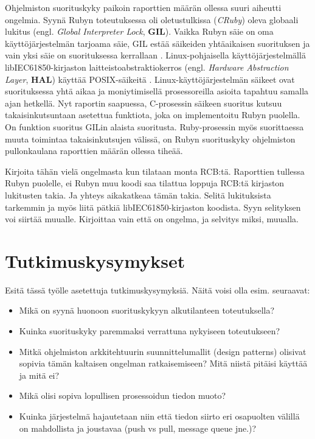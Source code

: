 Ohjelmiston suorituskyky paikoin raporttien määrän ollessa suuri aiheutti ongelmia. Syynä Rubyn toteutuksessa oli oletustulkissa (\emph{CRuby}) oleva globaali lukitus (engl. \emph{Global Interpreter Lock}, \textbf{GIL}). Vaikka Rubyn säie on oma käyttöjärjestelmän tarjoama säie, GIL estää säikeiden yhtäaikaisen suorituksen ja vain yksi säie on suorituksessa kerrallaan \mbox{\cite[s.~131--133]{Odaira2014}}. Linux-pohjaisella käyttöjärjestelmällä libIEC61850-kirjaston laitteistoabstraktiokerros (engl. \emph{Hardware Abstraction Layer}, \textbf{HAL}) käyttää POSIX-säikeitä \cite{libIEC61850-repo}. Linux-käyttöjärjestelmän säikeet ovat suorituksessa yhtä aikaa ja moniytimisellä prosessoreilla asioita tapahtuu samalla ajan hetkellä. Nyt raportin saapuessa, C-prosessin säikeen suoritus kutsuu takaisinkutsuntaan asetettua funktiota, joka on implementoitu Rubyn puolella. On funktion suoritus GILin alaista suoritusta. Ruby-prosessin myös suorittaessa muuta toimintaa takaisinkutsujen välissä, on Rubyn suorituskyky ohjelmiston pullonkaulana raporttien määrän ollessa tiheää.

\begin{it}
	Kirjoita tähän vielä ongelmasta kun tilataan monta RCB:tä. Raporttien tullessa Rubyn puolelle, ei Rubyn muu koodi saa tilattua loppuja RCB:tä kirjaston lukitusten takia. Ja yhteys aikakatkeaa tämän takia. Selitä lukituksista tarkemmin ja myös liitä pätkiä libIEC61850-kirjaston koodista. Syyn selityksen voi siirtää muualle. Kirjoittaa vain että on ongelma, ja selvitys miksi, muualla.
\end{it}

\section{Tutkimuskysymykset}
\begin{it}
Esitä tässä työlle asetettuja tutkimuskysymyksiä. Näitä voisi olla esim. seuraavat:
	\begin{itemize}
		\item Mikä on syynä huonoon suorituskykyyn alkutilanteen toteutuksella?
		\item Kuinka suorituskyky paremmaksi verrattuna nykyiseen toteutukseen?
		\item Mitkä ohjelmiston arkkitehtuurin suunnittelumallit (design patterns) olisivat sopivia tämän kaltaisen ongelman ratkaisemiseen? Mitä niistä pitäisi käyttää ja mitä ei?
		\item Mikä olisi sopiva lopullisen prosessoidun tiedon muoto?
		\item Kuinka järjestelmä hajautetaan niin että tiedon siirto eri osapuolten välillä on mahdollista ja joustavaa (push vs pull, message queue jne.)?
	\end{itemize}
\end{it}